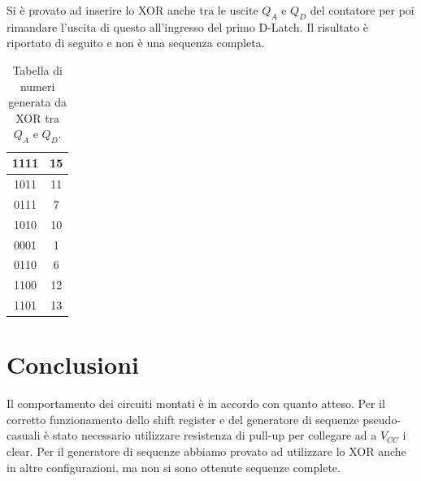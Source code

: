 \documentclass[10pt,a4paper]{article}
\begin{document}
Si è provato ad inserire lo XOR anche tra le uscite $Q_A$ e $Q_D$ del contatore per poi rimandare l'uscita di questo all'ingresso del primo D-Latch. Il risultato è riportato di seguito e non è una sequenza completa.

\begin{table}[!htb]
\centering
\begin{tabular}{|c|c|}
\hline 
1111 & 15 \\ 
\hline 
1011 & 11 \\ 
\hline 
0111 & 7 \\ 
\hline 
1010 & 10 \\ 
\hline 
0001 & 1 \\ 
\hline 
0110 & 6 \\ 
\hline 
1100 & 12 \\ 
\hline 
1101 & 13 \\ 
\hline 
\end{tabular}
\caption{Tabella di numeri generata da XOR tra $Q_A$ e $Q_D$.\label{AD}}  
\end{table}


\section{Conclusioni}
Il comportamento dei circuiti montati è in accordo con quanto atteso. Per il corretto funzionamento dello shift register e del generatore di sequenze pseudo-casuali è stato necessario utilizzare resistenza di pull-up per collegare ad a $V_{CC}$ i clear.
Per il generatore di sequenze abbiamo provato ad utilizzare lo XOR anche in altre configurazioni, ma non si sono ottenute sequenze complete.
\end{document}
